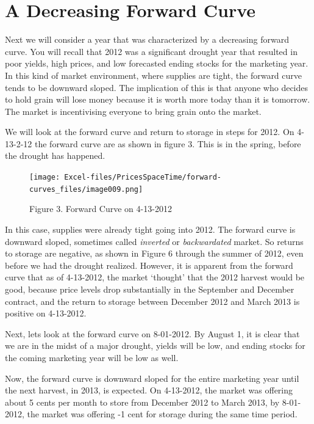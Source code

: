 \documentclass[
]{book}
\begin{document}
\hypertarget{a-decreasing-forward-curve}{%
\section{A Decreasing Forward Curve}\label{a-decreasing-forward-curve}}

Next we will consider a year that was characterized by a decreasing forward curve. You will recall that 2012 was a significant drought year that resulted in poor yields, high prices, and low forecasted ending stocks for the marketing year. In this kind of market environment, where supplies are tight, the forward curve tends to be downward sloped. The implication of this is that anyone who decides to hold grain will lose money because it is worth more today than it is tomorrow. The market is incentivising everyone to bring grain onto the market.

We will look at the forward curve and return to storage in steps for 2012. On 4-13-2-12 the forward curve are as shown in figure 3. This is in the spring, before the drought has happened.

\begin{figure}
\centering
\texttt{[image: Excel-files/PricesSpaceTime/forward-curves\_files/image009.png]}
\caption{Figure 3. Forward Curve on 4-13-2012}
\end{figure}

In this case, supplies were already tight going into 2012. The forward curve is downward sloped, sometimes called \emph{inverted} or \emph{backwardated} market. So returns to storage are negative, as shown in Figure 6 through the summer of 2012, even before we had the drought realized. However, it is apparent from the forward curve that as of 4-13-2012, the market `thought' that the 2012 harvest would be good, because price levels drop substantially in the September and December contract, and the return to storage between December 2012 and March 2013 is positive on 4-13-2012.

Next, lets look at the forward curve on 8-01-2012. By August 1, it is clear that we are in the midst of a major drought, yields will be low, and ending stocks for the coming marketing year will be low as well.

Now, the forward curve is downward sloped for the entire marketing year until the next harvest, in 2013, is expected. On 4-13-2012, the market was offering about 5 cents per month to store from December 2012 to March 2013, by 8-01-2012, the market was offering -1 cent for storage during the same time period.
\end{document}
